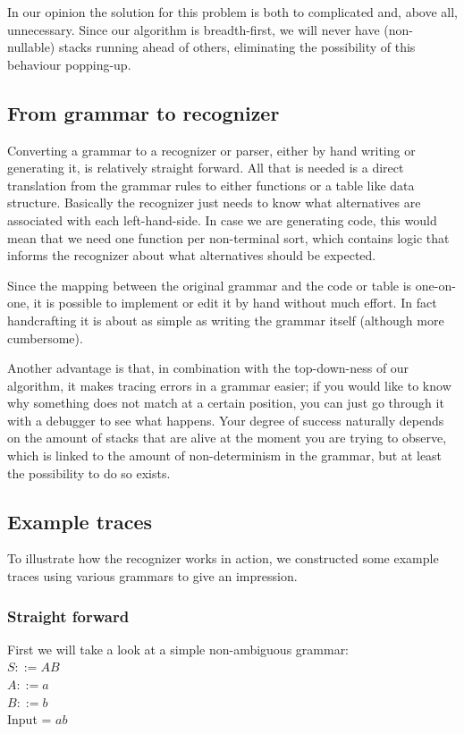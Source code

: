 \documentclass[a4paper,10pt]{article}
\begin{document}
In our opinion the solution for this problem is both to complicated and, above all, unnecessary. Since our algorithm is breadth-first, we will never have (non-nullable) stacks running ahead of others, eliminating the possibility of this behaviour popping-up.

\subsection{From grammar to recognizer}

Converting a grammar to a recognizer or parser, either by hand writing or generating it, is relatively straight forward. All that is needed is a direct translation from the grammar rules to either functions or a table like data structure. Basically the recognizer just needs to know what alternatives are associated with each left-hand-side. In case we are generating code, this would mean that we need one function per non-terminal sort, which contains logic that informs the recognizer about what alternatives should be expected.

Since the mapping between the original grammar and the code or table is one-on-one, it is possible to implement or edit it by hand without much effort. In fact handcrafting it is about as simple as writing the grammar itself (although more cumbersome).

Another advantage is that, in combination with the top-down-ness of our algorithm, it makes tracing errors in a grammar easier; if you would like to know why something does not match at a certain position, you can just go through it with a debugger to see what happens. Your degree of success naturally depends on the amount of stacks that are alive at the moment you are trying to observe, which is linked to the amount of non-determinism in the grammar, but at least the possibility to do so exists.

\subsection{Example traces}

To illustrate how the recognizer works in action, we constructed some example traces using various grammars to give an impression.

\pagebreak
\subsubsection{Straight forward}
First we will take a look at a simple non-ambiguous grammar:\\
$S ::= AB$\\
$A ::= a$\\
$B ::= b$\\
Input = $ab$
\end{document}
